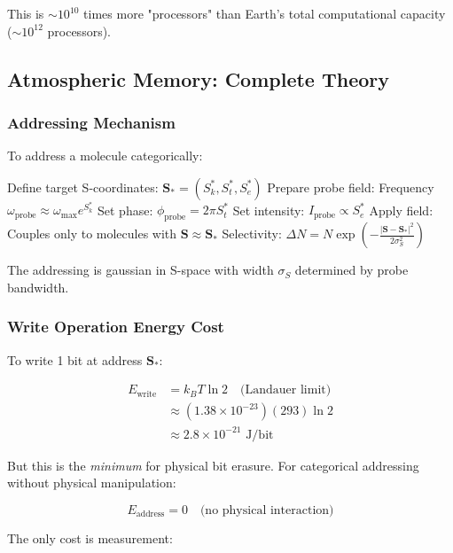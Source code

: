 This is $\sim 10^{10}$ times more "processors" than Earth's total computational capacity ($\sim 10^{12}$ processors).

\subsection{Atmospheric Memory: Complete Theory}

\subsubsection{Addressing Mechanism}

To address a molecule categorically:

\begin{algorithmic}[1]
\State Define target S-coordinates: $\mathbf{S}_* = (S_k^*, S_t^*, S_e^*)$
\State Prepare probe field: Frequency $\omega_{\text{probe}} \approx \omega_{\max}e^{S_k^*}$
\State Set phase: $\phi_{\text{probe}} = 2\pi S_t^*$
\State Set intensity: $I_{\text{probe}} \propto S_e^*$
\State Apply field: Couples only to molecules with $\mathbf{S} \approx \mathbf{S}_*$
\State Selectivity: $\Delta N = N\exp\left(-\frac{|\mathbf{S} - \mathbf{S}_*|^2}{2\sigma_S^2}\right)$
\end{algorithmic}

The addressing is gaussian in S-space with width $\sigma_S$ determined by probe bandwidth.

\subsubsection{Write Operation Energy Cost}

To write 1 bit at address $\mathbf{S}_*$:

\begin{align}
E_{\text{write}} &= k_B T \ln 2 \quad \text{(Landauer limit)} \\
&\approx (1.38 \times 10^{-23})(293)\ln 2 \\
&\approx 2.8 \times 10^{-21} \text{ J/bit}
\end{align}

But this is the \textit{minimum} for physical bit erasure. For categorical addressing without physical manipulation:

\begin{equation}
E_{\text{address}} = 0 \quad \text{(no physical interaction)}
\end{equation}

The only cost is measurement:

